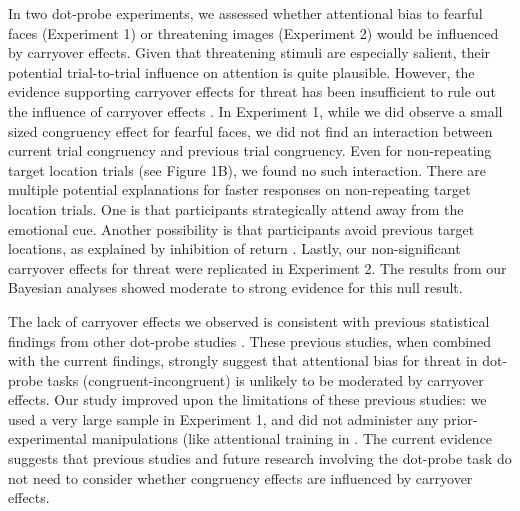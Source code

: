 \documentclass{article}
\begin{document}
{	In two dot-probe experiments, we assessed whether attentional bias to fearful faces (Experiment 1) or threatening images (Experiment 2) would be influenced by carryover effects. Given that threatening stimuli are especially salient, their potential trial-to-trial influence on attention is quite plausible. However, the evidence supporting carryover effects for threat has been insufficient to rule out the influence of carryover effects \textcite{[object Object], [object Object]}. In Experiment 1, while we did observe a small sized congruency effect for fearful faces, we did not find an interaction between current trial congruency and previous trial congruency. Even for non-repeating target location trials (see Figure 1B), we found no such interaction. {\color{4472C4}There are multiple potential explanations for faster responses on non-repeating target location trials. }{\color{4472C4}One is that participants strategically attend away from the emotional cue. }{\color{4472C4}Another possibility is that participants avoid previous target locations, as explained by inhibition of return }\textcite{[object Object]}{\color{4472C4}. }Lastly, our non-significant carryover effects for threat were replicated in Experiment 2. The results from our Bayesian analyses showed moderate to strong evidence for this null result.



	The lack of carryover effects we observed is consistent with {\color{4472C4}previous statistical findings from other dot}-probe studies \textcite{[object Object], [object Object]}\textcite{[object Object]}. These previous studies, when combined with the current findings, strongly suggest that attentional bias for threat in dot-probe tasks (congruent-incongruent) is unlikely to be moderated by carryover effects. Our study improved upon the limitations of these previous studies: we used a very large sample in Experiment 1, and did not administer any prior-experimental manipulations (like attentional training in \textcite{[object Object]}. The current evidence suggests that previous studies and future research involving the dot-probe task do not need to consider whether congruency effects are influenced by carryover effects.



}
\end{document}
